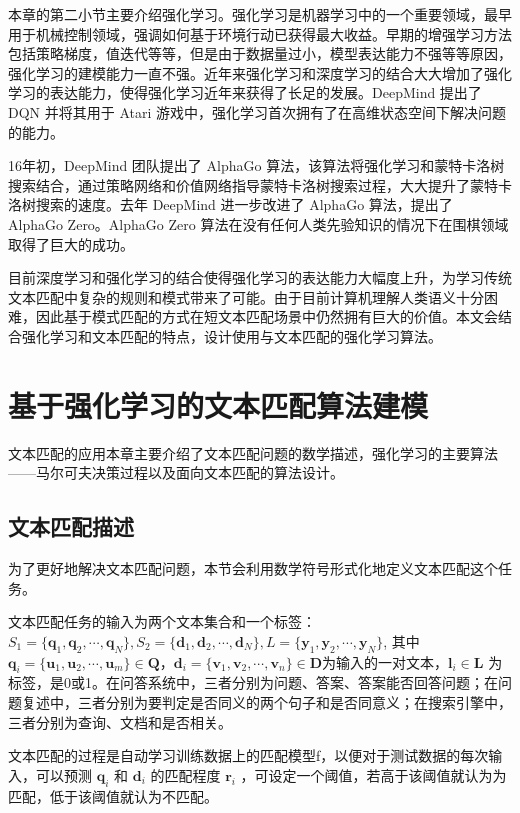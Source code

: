 本章的第二小节主要介绍强化学习。强化学习是机器学习中的一个重要领域，最早用于机械控制领域，强调如何基于环境行动已获得最大收益。早期的增强学习方法包括策略梯度，值迭代等等，但是由于数据量过小，模型表达能力不强等等原因，强化学习的建模能力一直不强。近年来强化学习和深度学习的结合大大增加了强化学习的表达能力，使得强化学习近年来获得了长足的发展。DeepMind 提出了 DQN 并将其用于 Atari 游戏中，强化学习首次拥有了在高维状态空间下解决问题的能力。

16年初，DeepMind 团队提出了 AlphaGo 算法，该算法将强化学习和蒙特卡洛树搜索结合，通过策略网络和价值网络指导蒙特卡洛树搜索过程，大大提升了蒙特卡洛树搜索的速度。去年 DeepMind 进一步改进了 AlphaGo 算法，提出了 AlphaGo Zero。AlphaGo Zero 算法在没有任何人类先验知识的情况下在围棋领域取得了巨大的成功。

目前深度学习和强化学习的结合使得强化学习的表达能力大幅度上升，为学习传统文本匹配中复杂的规则和模式带来了可能。由于目前计算机理解人类语义十分困难，因此基于模式匹配的方式在短文本匹配场景中仍然拥有巨大的价值。本文会结合强化学习和文本匹配的特点，设计使用与文本匹配的强化学习算法。

\chapter{基于强化学习的文本匹配算法建模}
文本匹配的应用本章主要介绍了文本匹配问题的数学描述，强化学习的主要算法——马尔可夫决策过程以及面向文本匹配的算法设计。
\section{文本匹配描述}
为了更好地解决文本匹配问题，本节会利用数学符号形式化地定义文本匹配这个任务。

文本匹配任务的输入为两个文本集合和一个标签：$S_1=\{\mathbf{q}_1, \mathbf{q}_2,\cdots,\mathbf{q}_N\}, S_2=\{\mathbf{d}_1, \mathbf{d}_2,\cdots,\mathbf{d}_N\}, L=\{\mathbf{y}_1, \mathbf{y}_2, \cdots, \mathbf{y}_N\}$,
其中 $\mathbf{q}_i = \{\mathbf{u}_1, \mathbf{u}_2, \cdots, \mathbf{u}_m\} \in \mathbf{Q}$，$\mathbf{d}_i = \{\mathbf{v}_1, \mathbf{v}_2, \cdots, \mathbf{v}_n\} \in \mathbf{D}$为输入的一对文本，$\mathbf{l}_i \in \mathbf{L}$ 为标签，是0或1。在问答系统中，三者分别为问题、答案、答案能否回答问题；在问题复述中，三者分别为要判定是否同义的两个句子和是否同意义；在搜索引擎中，三者分别为查询、文档和是否相关。

文本匹配的过程是自动学习训练数据上的匹配模型f，以便对于测试数据的每次输入，可以预测 $\mathbf{q}_i$ 和 $\mathbf{d}_i$ 的匹配程度 $\mathbf{r}_i$ ，可设定一个阈值，若高于该阈值就认为为匹配，低于该阈值就认为不匹配。

